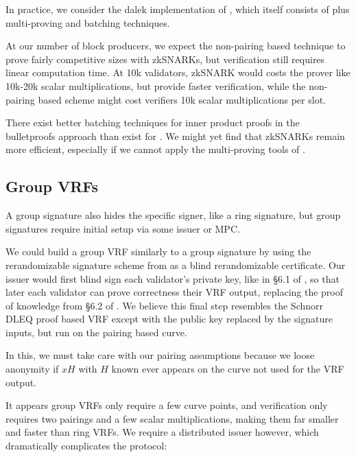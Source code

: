In practice, we consider the dalek implementation \cite{dalek_bulletproofs} of \cite{bulletproofs}, which itself consists of \cite{bccgp2016} plus multi-proving and batching techniques.

At our number of block producers, we expect the non-pairing based technique to prove fairly competitive sizes with zkSNARKs, but verification still requires linear computation time.  At 10k validators, zkSNARK would costs the prover like 10k-20k scalar multiplications, but provide faster verification, while the non-pairing based scheme might cost verifiers 10k scalar multiplications per slot.  

There exist better batching techniques for inner product proofs \cite{bccgp2016} in the bulletproofs approach \cite{bulletproofs} than exist for \cite{Groth16}.  We might yet find that zkSNARKs remain more efficient, especially if we cannot apply the multi-proving tools of \cite{bulletproofs}.


\subsection{Group VRFs}
\label{sec:groupVRF}

A group signature also hides the specific signer, like a ring signature, but group signatures require initial setup via some issuer or MPC. 

We could build a group VRF similarly to a group signature by using the rerandomizable signature scheme from \cite{PS16} as a blind rerandomizable certificate.  Our issuer would first blind sign each validator's private key, like in \S6.1 of \cite{PS16}, so that later each validator can prove correctness their VRF output, replacing the proof of knowledge from \S6.2 of \cite{PS16}.  We believe this final step resembles the Schnorr DLEQ proof based VRF except with the public key replaced by the signature inputs, but run on the pairing based curve.

In this, we must take care with our pairing assumptions because we loose anonymity if $x H$ with $H$ known ever appears on the curve not used for the VRF output.  

It appears group VRFs only require a few curve points, and verification only requires two pairings and a few scalar multiplications, making them far smaller and faster than ring VRFs.  We require a distributed issuer however, which dramatically complicates the protocol:

